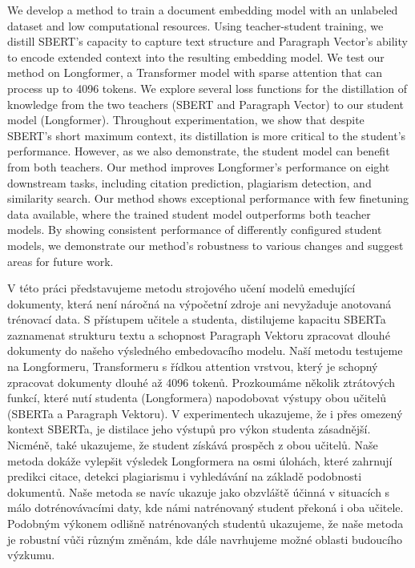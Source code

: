 \documentclass[12pt]{report}
\begin{document}

We develop a method to train a document embedding model with an unlabeled
dataset and low computational resources. Using teacher-student training, we
distill SBERT's capacity to capture text structure and Paragraph Vector's
ability to encode extended context into the resulting embedding model. We test
our method on Longformer, a Transformer model with sparse attention that can
process up to 4096 tokens. We explore several loss functions for the
distillation of knowledge from the two teachers (SBERT and Paragraph Vector) to
our student model (Longformer). Throughout experimentation, we show that
despite SBERT's short maximum context, its distillation is more critical to the
student's performance. However, as we also demonstrate, the student model can
benefit from both teachers. Our method improves Longformer's performance on
eight downstream tasks, including citation prediction, plagiarism detection,
and similarity search. Our method shows exceptional performance with few
finetuning data available, where the trained student model outperforms both
teacher models. By showing consistent performance of differently configured
student models, we demonstrate our method's robustness to various changes and
suggest areas for future work.

V této práci představujeme metodu strojového učení modelů emedující dokumenty,
která není náročná na výpočetní zdroje ani nevyžaduje anotovaná trénovací data.
S přístupem učitele a studenta, distilujeme kapacitu SBERTa zaznamenat
strukturu textu a schopnost Paragraph Vektoru zpracovat dlouhé dokumenty do
našeho výsledného embedovacího modelu. Naší metodu testujeme na Longformeru,
Transformeru s řídkou attention vrstvou, který je schopný zpracovat dokumenty
dlouhé až 4096 tokenů. Prozkoumáme několik ztrátových funkcí, které nutí
studenta (Longformera) napodobovat výstupy obou učitelů (SBERTa a Paragraph
Vektoru). V experimentech ukazujeme, že i přes omezený kontext SBERTa, je
distilace jeho výstupů pro výkon studenta zásadnější. Nicméně, také ukazujeme,
že student získává prospěch z obou učitelů. Naše metoda dokáže vylepšit
výsledek Longformera na osmi úlohách, které zahrnují predikci citace, detekci
plagiarismu i vyhledávání na základě podobnosti dokumentů. Naše metoda se navíc
ukazuje jako obzvláště účinná v situacích s málo dotrénovávacími daty, kde námi
natrénovaný student překoná i oba učitele. Podobným výkonem odlišně
natrénovaných studentů ukazujeme, že naše metoda je robustní vůči různým
změnám, kde dále navrhujeme možné oblasti budoucího výzkumu.
\end{document}
